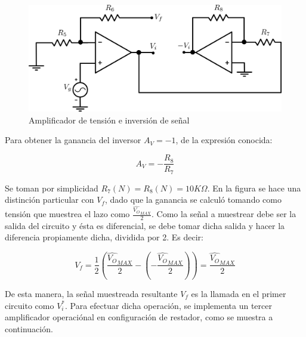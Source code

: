 \begin{figure}[!ht]
\begin{centering}
\includegraphics[scale=0.5]{Imagenes/opamp2SinCap.png}
\par\end{centering}
\caption{Amplificador de tensión e inversión de señal}
\end{figure}

Para obtener la ganancia del inversor $A_V = -1$, de la expresión conocida:

\[
A_V = -\frac{R_8}{R_7}
\]

Se toman por simplicidad $R_7(N) = R_8(N) = 10K\Omega$.
En la figura se hace una distinción particular con $V_f$, dado que la ganancia se calculó tomando como tensión que muestrea el lazo como $\frac{\hat{V_O}_{MAX}}{2}$. Como la señal a muestrear debe ser la salida del circuito y ésta es diferencial, se debe tomar dicha salida y hacer la diferencia propiamente dicha, dividida por 2. Es decir:

\[
V_f = \frac{1}{2}\left( \frac{\hat{V_O}_{MAX}}{2} - \left( -\frac{\hat{V_O}_{MAX}}{2} \right) \right) = \frac{\hat{V_O}_{MAX}}{2}
\]

De esta manera, la señal muestreada resultante $V_f$ es la llamada en el primer circuito como $V_i^*$. Para efectuar dicha operación, se implementa un tercer amplificador operaciónal en configuración de restador, como se muestra a continuación.

